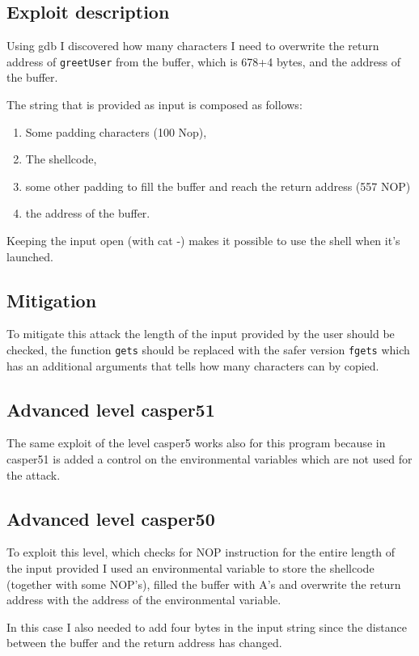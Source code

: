 \documentclass[a4paper,12pt]{article}
\begin{document}
\subsection{Exploit description}
Using gdb I discovered how many characters I need to overwrite the return address of \texttt{greetUser} from the buffer, which is 678+4 bytes, and the address of the buffer.

The string that is provided as input is composed as follows:
\begin{enumerate}
\item Some padding characters (100 Nop),
\item The shellcode,
\item some other padding to fill the buffer and reach the return address (557 NOP)
\item the address of the buffer.
\end{enumerate}

Keeping the input open (with cat -) makes it possible to use the shell when it's launched.


\subsection{Mitigation}

To mitigate this attack the length of the input provided by the user should be checked, the function \texttt{gets} should be replaced with the safer version \texttt{fgets} which has an additional arguments that tells how many characters can by copied.

\subsection{Advanced level casper51}
The same exploit of the level casper5 works also for this program because in casper51 is added a control on the environmental variables which are not used for the attack. 


\subsection{Advanced level casper50}

To exploit this level, which checks for NOP instruction for the entire length of the input provided I used an environmental variable to store the shellcode (together with some NOP's), filled the buffer with A's and overwrite the return address with the address of the environmental variable.

In this case I also needed to add four bytes in the input string since the distance between the buffer and the return address has changed.
\end{document}
